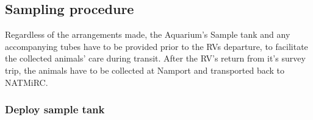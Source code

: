 \documentclass[
  12pt,
]{report}
\begin{document}
\hypertarget{sampling-procedure}{%
\subsection{Sampling procedure}\label{sampling-procedure}}

Regardless of the arrangements made, the Aquarium's Sample tank and any
accompanying tubes have to be provided prior to the RVs departure, to
facilitate the collected animals' care during transit. After the RV's
return from it's survey trip, the animals have to be collected at
Namport and transported back to NATMiRC.

\hypertarget{deploy-sample-tank}{%
\subsubsection{Deploy sample tank}\label{deploy-sample-tank}}
\end{document}
